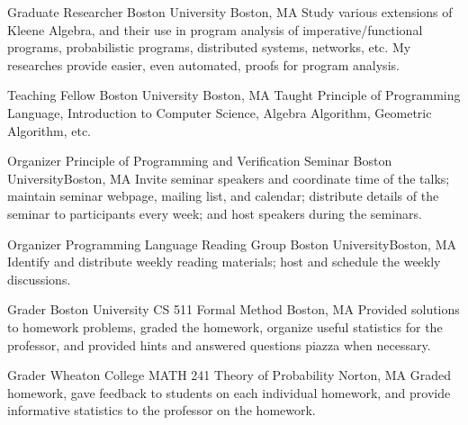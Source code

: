 \documentclass[11pt,roman]{moderncv}        %
\begin{document}
{Graduate Researcher}
{Boston University}
{Boston, MA}{}
{Study various extensions of Kleene Algebra, and their use in program analysis
of imperative/functional programs, probabilistic programs, distributed systems, networks, etc.
My researches provide easier, even automated, proofs for program analysis.
}

{Teaching Fellow}
{Boston University}
{Boston, MA}{}
{
  Taught Principle of Programming Language, Introduction to Computer Science,
  Algebra Algorithm, Geometric Algorithm, etc.
}


{Organizer}
{Principle of Programming and Verification Seminar}
{Boston University}{Boston, MA}
{Invite seminar speakers and coordinate time of the talks;
maintain seminar webpage, mailing list, and calendar;
distribute details of the seminar to participants every week;
and host speakers during the seminars.}

{Organizer}
{Programming Language Reading Group}
{Boston University}{Boston, MA}
{Identify and distribute weekly reading materials;
host and schedule the weekly discussions.}

{Grader}
{Boston University CS 511 Formal Method}
{Boston, MA}{}
{Provided solutions to homework problems, graded the homework,
organize useful statistics for the professor, 
and provided hints and answered questions piazza when necessary.}

{Grader}
{Wheaton College MATH 241 Theory of Probability}
{Norton, MA}{}
{Graded homework, gave feedback to students on each individual homework,
and provide informative statistics to the professor on the homework.}
\end{document}
